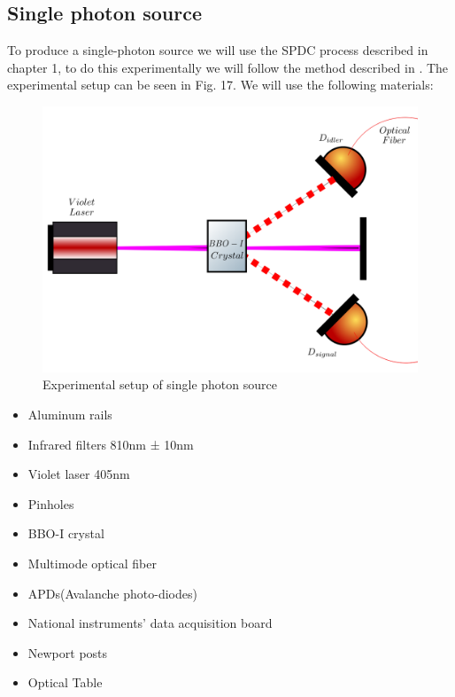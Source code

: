 \documentclass[12pt]{book}
\begin{document}
\subsection{Single photon source}

To produce a single-photon source we will use the SPDC process described in chapter 1, to do this experimentally we will follow the method described in \cite{maestria_procopio}. The experimental setup can be seen in Fig. 17.  We will use the following materials:

\begin{figure}[!htb]
\centering
\includegraphics[width=\linewidth]{images/SPDC_exp.png}
\caption{Experimental setup of single photon source}
\label{fig:BS2}
\end{figure}



\begin{itemize}

\item Aluminum rails
\item Infrared filters 810nm ± 10nm
\item Violet laser 405nm
\item Pinholes
\item BBO-I crystal
\item Multimode optical fiber
\item APDs(Avalanche photo-diodes)
\item National instruments' data acquisition board 
\item Newport posts
\item Optical Table

\end{itemize}
\end{document}
